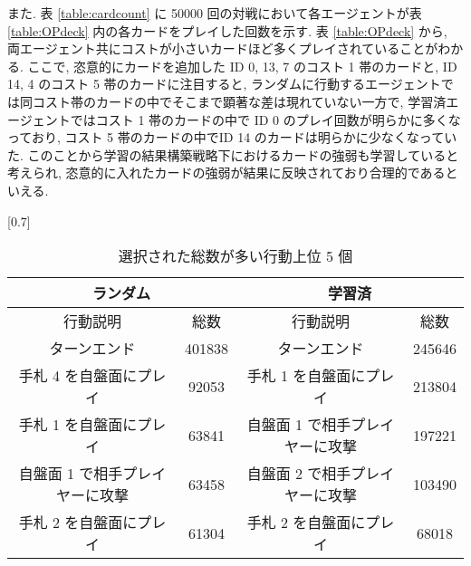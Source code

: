 \documentclass[twocolumn]{jarticle}     %
\begin{document}
       また. 表 \ref{table:cardcount} に 50000 回の対戦において各エージェントが表 \ref{table:OPdeck} 内の各カードをプレイした回数を示す. 表 \ref{table:OPdeck} から, 両エージェント共にコストが小さいカードほど多くプレイされていることがわかる. ここで, 恣意的にカードを追加した ID 0, 13, 7 のコスト 1 帯のカードと, ID 14, 4 のコスト 5 帯のカードに注目すると, ランダムに行動するエージェントでは同コスト帯のカードの中でそこまで顕著な差は現れていない一方で, 学習済エージェントではコスト 1 帯のカードの中で ID 0 のプレイ回数が明らかに多くなっており, コスト 5 帯のカードの中でID 14 のカードは明らかに少なくなっていた. このことから学習の結果構築戦略下におけるカードの強弱も学習していると考えられ, 恣意的に入れたカードの強弱が結果に反映されており合理的であるといえる. 
       \begin{table}[t]
         \centering
         \caption{選択された総数が多い行動上位 5 個}
         \vspace{-0.3cm}
         \label{table:actioncount}
         \scalebox{0.65}[0.7]{
           \begin{tabular}{|cc|cc|}
             \hline
             \multicolumn{2}{|c|}{ランダム}      & \multicolumn{2}{c|}{学習済}       \\ \hline
             \multicolumn{1}{|c|}{行動説明} & 総数 & \multicolumn{1}{c|}{行動説明} & 総数 \\ \hline \hline
             \multicolumn{1}{|c|}{ターンエンド}    & 401838  & \multicolumn{1}{c|}{ターンエンド}    & 245646  \\ \hline
             \multicolumn{1}{|c|}{手札 4 を自盤面にプレイ}    &  92053  & \multicolumn{1}{c|}{手札 1 を自盤面にプレイ}    & 213804  \\ \hline
             \multicolumn{1}{|c|}{手札 1 を自盤面にプレイ}    & 63841  & \multicolumn{1}{c|}{自盤面 1 で相手プレイヤーに攻撃}    & 197221  \\ \hline
             \multicolumn{1}{|c|}{自盤面 1 で相手プレイヤーに攻撃}    & 63458  & \multicolumn{1}{c|}{自盤面 2 で相手プレイヤーに攻撃}    & 103490  \\ \hline
             \multicolumn{1}{|c|}{手札 2 を自盤面にプレイ}    & 61304  & \multicolumn{1}{c|}{手札 2 を自盤面にプレイ}    & 68018  \\ \hline
             \end{tabular}
         }
       \end{table}
\end{document}
